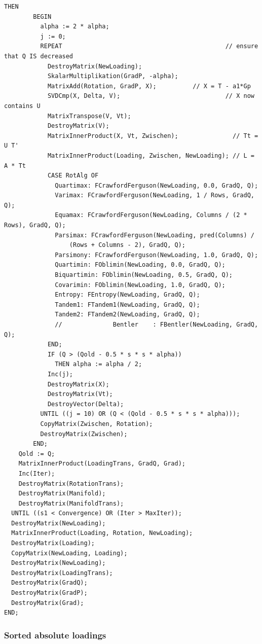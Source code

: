 \begin{lstlisting}[caption=Implementation of the gradient projection algorithm for orthogonal rotation]
      THEN
        BEGIN
          alpha := 2 * alpha;
          j := 0;
          REPEAT                                             // ensure that Q IS decreased
            DestroyMatrix(NewLoading);
            SkalarMultiplikation(GradP, -alpha);
            MatrixAdd(Rotation, GradP, X);          // X = T - a1*Gp
            SVDCmp(X, Delta, V);                             // X now contains U
            MatrixTranspose(V, Vt);
            DestroyMatrix(V);
            MatrixInnerProduct(X, Vt, Zwischen);               // Tt = U T'
            MatrixInnerProduct(Loading, Zwischen, NewLoading); // L = A * Tt
            CASE RotAlg OF
              Quartimax: FCrawfordFerguson(NewLoading, 0.0, GradQ, Q);
              Varimax: FCrawfordFerguson(NewLoading, 1 / Rows, GradQ, Q);
              Equamax: FCrawfordFerguson(NewLoading, Columns / (2 * Rows), GradQ, Q);
              Parsimax: FCrawfordFerguson(NewLoading, pred(Columns) /
                  (Rows + Columns - 2), GradQ, Q);
              Parsimony: FCrawfordFerguson(NewLoading, 1.0, GradQ, Q);
              Quartimin: FOblimin(NewLoading, 0.0, GradQ, Q);
              Biquartimin: FOblimin(NewLoading, 0.5, GradQ, Q);
              Covarimin: FOblimin(NewLoading, 1.0, GradQ, Q);
              Entropy: FEntropy(NewLoading, GradQ, Q);
              Tandem1: FTandem1(NewLoading, GradQ, Q);
              Tandem2: FTandem2(NewLoading, GradQ, Q);
              //              Bentler    : FBentler(NewLoading, GradQ, Q);
            END;
            IF (Q > (Qold - 0.5 * s * s * alpha)) 
              THEN alpha := alpha / 2;
            Inc(j);
            DestroyMatrix(X);
            DestroyMatrix(Vt);
            DestroyVector(Delta);
          UNTIL ((j = 10) OR (Q < (Qold - 0.5 * s * s * alpha)));
          CopyMatrix(Zwischen, Rotation);
          DestroyMatrix(Zwischen);
        END;
    Qold := Q;
    MatrixInnerProduct(LoadingTrans, GradQ, Grad);
    Inc(Iter);
    DestroyMatrix(RotationTrans);
    DestroyMatrix(Manifold);
    DestroyMatrix(ManifoldTrans);
  UNTIL ((s1 < Convergence) OR (Iter > MaxIter));
  DestroyMatrix(NewLoading);
  MatrixInnerProduct(Loading, Rotation, NewLoading);
  DestroyMatrix(Loading);
  CopyMatrix(NewLoading, Loading);
  DestroyMatrix(NewLoading);
  DestroyMatrix(LoadingTrans);
  DestroyMatrix(GradQ);
  DestroyMatrix(GradP);
  DestroyMatrix(Grad);
END;
\end{lstlisting}

\subsubsection{Sorted absolute loadings}

